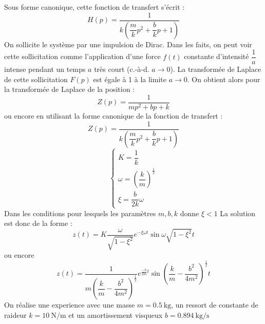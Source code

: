 Sous forme canonique, cette fonction de transfert s'écrit :
\[
    H(p)=\dfrac{1}{k\left(\dfrac{m}{k}p^2+\dfrac{b}{k}p+1\right)}
\]
On sollicite le système par une impulsion de Dirac. Dans les faits, on peut 
voir cette sollicitation comme l'application d'une force $f(t)$ constante 
d'intensité $\dfrac{1}{a}$ intense pendant un temps $a$ très court 
(c.-à-d. $a\to0$).    
La transformée de Laplace de cette sollicitation $F(p)$ est égale à 1 à 
la limite $a\to0$. On obtient alors pour la transformée de Laplace de la 
position :
\[
    Z(p)=\dfrac{1}{mp^2+bp+k}
\]
ou encore en utilisant la forme canonique de la fonction de transfert :
\[
    Z(p)=\dfrac{1}{k\left(\dfrac{m}{k}p^2+\dfrac{b}{k}p+1\right)}
\]
\[
    \begin{cases}
        K=\dfrac{1}{k}\\[1.5em]
        \omega=\left(\dfrac{k}{m}\right)^{\frac{1}{2}}\\[1.5em]
        \xi=\dfrac{b}{2k}\omega
    \end{cases}
\]
Dans les conditions pour lesquels les paramètres $m, b ,k$ donne $\xi<1$ 
La solution est donc de la forme :
\[
    z(t)=K\dfrac{\omega}{\sqrt{1-\xi^2}}
         e^{-\xi\omega t}\sin{\omega\sqrt{1-\xi^2} t} 
\]
ou encore 
\[
    z(t)=\dfrac{1}{m\left(\dfrac{k}{m}-\dfrac{b^2}{4m^2}\right)^{\frac{1}{2}}}
         e^{\frac{-b}{2m}t}\sin{\left(\dfrac{k}{m}-\dfrac{b^2}{4m^2}\right)^
         {\frac{1}{2}}t}
\]
On réalise une experience avec une masse $m=\SI{0.5}{\kilogram}$, un ressort 
de constante de raideur $k=\SI{10}{\newton\per\meter}$ et un amortissement 
visqueux $b=\SI{0.894}{\kilogram\per\second}$
